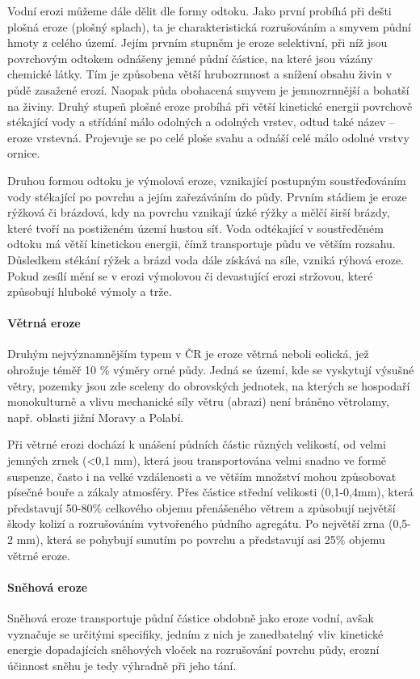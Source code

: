 Vodní erozi můžeme dále dělit dle formy odtoku. Jako první probíhá při dešti plošná eroze (plošný splach), ta je charakteristická rozrušováním a smyvem půdní hmoty z celého území. Jejím prvním stupněm je eroze selektivní, při níž jsou povrchovým odtokem odnášeny jemné půdní částice, na které jsou vázány chemické látky. Tím je způsobena větší hrubozrnnost a snížení obsahu živin v půdě zasažené erozí. Naopak půda obohacená smyvem je jemnozrnnější a bohatší na živiny. Druhý stupeň plošné eroze probíhá při větší kinetické energii povrchově stékající vody a střídání málo odolných a odolných vrstev, odtud také název – eroze vrstevná. Projevuje se po celé ploše svahu a odnáší celé málo odolné vrstvy ornice.

Druhou formou odtoku je výmolová eroze, vznikající postupným soustřeďováním vody stékající po povrchu a jejím zařezáváním do půdy. Prvním stádiem je eroze rýžková či brázdová, kdy na povrchu vznikají úzké rýžky a mělčí širší brázdy, které tvoří na postiženém území hustou síť. Voda odtékající v soustředěném odtoku má větší kinetickou energii, čímž transportuje půdu ve větším rozsahu. Důsledkem stékání rýžek a brázd voda dále získává na síle, vzniká rýhová eroze. Pokud zesílí mění se v erozi výmolovou či devastující erozi stržovou, které způsobují hluboké výmoly a trže.
\paragraph{Větrná eroze}
Druhým nejvýznamnějším typem v ČR je eroze větrná neboli eolická, jež ohrožuje téměř 10 \% výměry orné půdy. Jedná se území, kde se vyskytují výsušné větry, pozemky jsou zde sceleny do obrovských jednotek, na kterých se hospodaří monokulturně a vlivu mechanické síly větru (abrazi) není bráněno větrolamy, např. oblasti jižní Moravy a Polabí. 

Při větrné erozi dochází k unášení půdních částic různých velikostí, od velmi jemných zrnek (<0,1 mm), která jsou transportována velmi snadno ve formě suspenze, často i na velké vzdálenosti a ve větším množství mohou způsobovat písečné bouře a zákaly atmosféry. Přes částice střední velikosti (0,1-0,4mm), která představují 50-80\% celkového objemu přenášeného větrem a způsobují největší škody kolizí a rozrušováním vytvořeného půdního agregátu. Po největší zrna (0,5-2 mm), která se pohybují sunutím po povrchu a představují asi 25\% objemu větrné eroze.

\paragraph{Sněhová eroze}
Sněhová eroze transportuje půdní částice obdobně jako eroze vodní, avšak vyznačuje se určitými specifiky, jedním z nich je zanedbatelný vliv kinetické energie dopadajících sněhových vloček na rozrušování povrchu půdy, erozní účinnost sněhu je tedy výhradně při jeho tání. 

